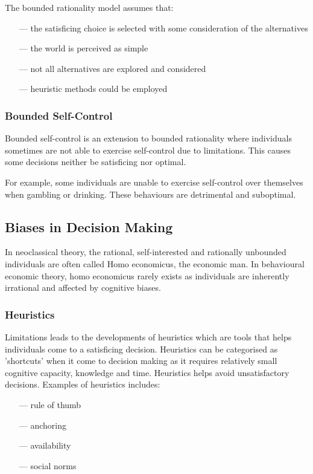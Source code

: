 \documentclass[a4paper,10pt]{article}
\begin{document}
\begin{multicols*}{2}
	The bounded rationality model assumes that:
	\begin{itemize}
		\item[---] the satisficing choice is selected with some consideration of the alternatives
		\item[---] the world is perceived as simple
		\item[---] not all alternatives are explored and considered
		\item[---] heuristic methods could be employed
	\end{itemize}
	\subsubsection{Bounded Self-Control}
	Bounded self-control is an extension to bounded rationality where individuals sometimes are not able to exercise self-control due to limitations. This causes some decisions neither be satisficing nor optimal.
	\medskip

	For example, some individuals are unable to exercise self-control over themselves when gambling or drinking. These behaviours are detrimental and suboptimal.

	\subsection{Biases in Decision Making}
	In neoclassical theory, the rational, self-interested and rationally unbounded individuals are often called Homo economicus, the economic man. In behavioural economic theory, homo economicus rarely exists as individuals are inherently irrational and affected by cognitive biases.

	\subsubsection{Heuristics}
	Limitations leads to the developments of heuristics which are tools that helps individuals come to a satisficing decision. Heuristics can be categorised as 'shortcuts' when it come to decision making as it requires relatively small cognitive capacity, knowledge and time. Heuristics helps avoid unsatisfactory decisions. Examples of heuristics includes:
	\begin{itemize}
		\item[---] rule of thumb
		\item[---] anchoring
		\item[---] availability
		\item[---] social norms
	\end{itemize}


\end{multicols*}
\end{document}
